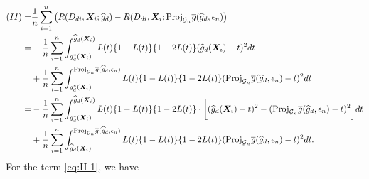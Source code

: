 \documentclass[11pt]{article}
\numberwithin{equation}{section}
\begin{document}
\begin{align}
	(II)=&\frac{1}{n}\sum_{i=1}^n\left(R(D_{di},\boldsymbol{X}_{i};\widehat{g}_d)-R(D_{di},\boldsymbol{X}_{i};\text{Proj}_{\mathcal{G}_n}\overline{g}(\widehat{g}_d,\epsilon_n)\right) \notag	\\
	=&-\frac{1}{n}\sum_{i=1}^n\int_{g_d^*(\boldsymbol{X}_i)}^{\widehat{g}_d(\boldsymbol{X}_i)}L(t)\{1-L(t)\}\{1-2L(t)\}(\widehat{g}_d(\boldsymbol{X}_i)-t)^2dt  \notag\\
	&+\frac{1}{n}\sum_{i=1}^n\int_{g_d^*(\boldsymbol{X}_i)}^{\text{Proj}_{\mathcal{G}_n}\overline{g}(\widehat{g}_d,\epsilon_n)}L(t)\{1-L(t)\}\{1-2L(t)\}(\text{Proj}_{\mathcal{G}_n}\overline{g}(\widehat{g}_d,\epsilon_n)-t)^2dt \notag\\
	=&-\frac{1}{n}\sum_{i=1}^n\int_{g_d^*(\boldsymbol{X}_i)}^{\widehat{g}_d(\boldsymbol{X}_i)}L(t)\{1-L(t)\}\{1-2L(t)\}\cdot\bigg[(\widehat{g}_d(\boldsymbol{X}_i)-t)^2-(\text{Proj}_{\mathcal{G}_n}\overline{g}(\widehat{g}_d,\epsilon_n)-t)^2\bigg]dt \label{eq:II-1}\\
	&+\frac{1}{n}\sum_{i=1}^n\int_{\widehat{g}_d(\boldsymbol{X}_i)}^{\text{Proj}_{\mathcal{G}_n}\overline{g}(\widehat{g}_d,\epsilon_n)}L(t)\{1-L(t)\}\{1-2L(t)\}(\text{Proj}_{\mathcal{G}_n}\overline{g}(\widehat{g}_d,\epsilon_n)-t)^2dt.\label{eq:II-2}
\end{align}
For the term \eqref{eq:II-1}, we have
\end{document}
